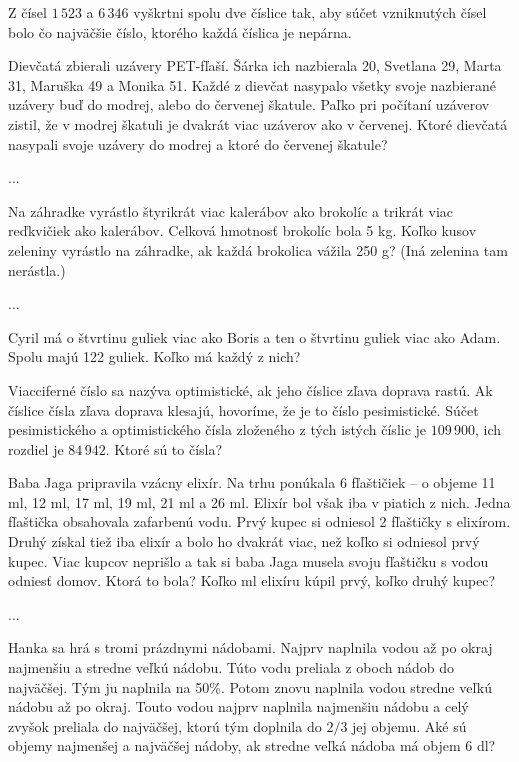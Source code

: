{%
Z čísel $1\,523$ a $6\,346$ vyškrtni spolu dve číslice tak, aby súčet vzniknutých čísel bolo čo
najväčšie číslo, ktorého každá číslica je nepárna.}

{%
Dievčatá zbierali uzávery PET-fľaší. Šárka ich nazbierala 20, Svetlana 29, Marta 31, Maruška
49 a Monika 51. Každé z dievčat nasypalo všetky svoje nazbierané uzávery buď do modrej,
alebo do červenej škatule. Paľko pri počítaní uzáverov zistil, že v modrej škatuli je dvakrát viac
uzáverov ako v červenej. Ktoré dievčatá nasypali svoje uzávery do modrej a ktoré do červenej
škatule?}

{%
...}

{%
Na záhradke vyrástlo štyrikrát viac kalerábov ako brokolíc a trikrát viac reďkvičiek ako
kalerábov. Celková hmotnosť brokolíc bola 5 kg. Koľko kusov zeleniny vyrástlo na záhradke, ak
každá brokolica vážila 250 g? (Iná zelenina tam nerástla.)}

{%
...}

{%
Cyril má o štvrtinu guliek viac ako Boris a ten o štvrtinu guliek viac ako Adam. Spolu majú
122 guliek. Koľko má každý z nich?}

{%
Viacciferné číslo sa nazýva optimistické, ak jeho číslice zľava doprava rastú. Ak číslice čísla
zľava doprava klesajú, hovoríme, že je to číslo pesimistické. Súčet pesimistického a
optimistického čísla zloženého z tých istých číslic je $109\,900$, ich rozdiel je $84\,942$. Ktoré sú to
čísla?}

{%
Baba Jaga pripravila vzácny elixír. Na trhu ponúkala 6 fľaštičiek -- o objeme 11 ml, 12 ml,
17 ml, 19 ml, 21 ml a 26 ml. Elixír bol však iba v piatich z nich. Jedna fľaštička obsahovala
zafarbenú vodu. Prvý kupec si odniesol 2 fľaštičky s elixírom. Druhý získal tiež iba elixír a
bolo ho dvakrát viac, než koľko si odniesol prvý kupec. Viac kupcov neprišlo a tak si baba
Jaga musela svoju fľaštičku s vodou odniesť domov. Ktorá to bola? Koľko ml elixíru kúpil
prvý, koľko druhý kupec?}

{%
...}

{%
Hanka sa hrá s tromi prázdnymi nádobami. Najprv naplnila vodou až po okraj najmenšiu a
stredne veľkú nádobu. Túto vodu preliala z oboch nádob do najväčšej. Tým ju naplnila na
50\%. Potom znovu naplnila vodou stredne veľkú nádobu až po okraj. Touto vodou najprv
naplnila najmenšiu nádobu a celý zvyšok preliala do najväčšej, ktorú tým doplnila do $2/3$ jej
objemu. Aké sú objemy najmenšej a najväčšej nádoby, ak stredne veľká nádoba má objem
6 dl?}

